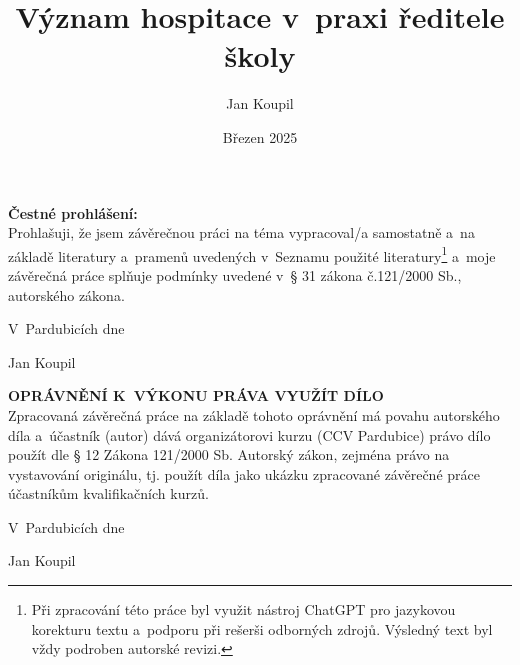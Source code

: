 

\author{Jan Koupil}
\title{Význam hospitace v~praxi ředitele školy}
\date{Březen 2025}




\newpage

\setcounter{page}{2}

\vspace*{\fill}

\noindent \textbf{Čestné prohlášení:} \\

Prohlašuji, že jsem závěrečnou práci na téma \textbf{\topic}
vypracoval/a samostatně a~na základě literatury a~pramenů uvedených v~Seznamu použité literatury\footnote{Při zpracování této práce byl využit nástroj ChatGPT pro jazykovou korekturu textu a~podporu při rešerši odborných zdrojů. Výsledný text byl vždy podroben autorské revizi.} a~moje závěrečná práce splňuje podmínky uvedené v~§ 31 zákona č.121/2000 Sb., autorského zákona.

\vspace{1cm}

\hfill V~Pardubicích dne \dotfill  
\vspace{1cm}

\hfill
Jan Koupil

\newpage

\vspace*{\fill}

\noindent \textbf{OPRÁVNĚNÍ K~VÝKONU PRÁVA VYUŽÍT DÍLO} \\

Zpracovaná závěrečná práce na základě tohoto oprávnění má povahu autorského díla a~účastník (autor) dává organizátorovi kurzu (CCV Pardubice) právo dílo použít dle § 12 Zákona 121/2000 Sb. Autorský zákon, zejména právo na vystavování originálu, tj. použít díla jako ukázku zpracované závěrečné práce účastníkům kvalifikačních kurzů.

\vspace{1cm}

\hfill V~Pardubicích dne \dotfill  

\hfill
Jan Koupil

\newpage
